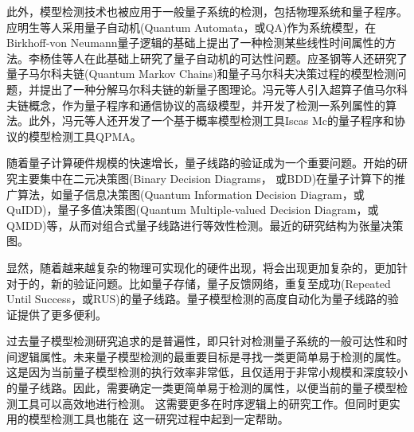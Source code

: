 此外，模型检测技术也被应用于一般量子系统的检测，包括物理系统和量子程序。应明生等人采用量子自动机(Quantum Automata，或QA)作为系统模型\citep{kondacs1997power}，在Birkhoff-von Neumann量子逻辑\citep{birkhoff1987logic}的基础上提出了一种检测某些线性时间属性的方法\citep{ying2014model}。李杨佳等人在此基础上研究了量子自动机的可达性问题\citep{li2014decidable}。应圣钢等人还研究了量子马尔科夫链(Quantum Markov Chains)\citep{ying2013verification}和量子马尔科夫决策过程的模型检测问题，并提出了一种分解马尔科夫链的新量子图理论\citep{ying2013reachability,ying2018reachability}。冯元等人引入超算子值马尔科夫链概念，作为量子程序和通信协议的高级模型，并开发了检测一系列属性的算法\citep{feng2013model,feng2013reachability,feng2017model}。此外，冯元等人还开发了一个基于概率模型检测工具Iscas Mc\citep{hahn2014iscas}的量子程序和协议的模型检测工具QPMA\citep{feng2015qpmc}。

随着量子计算硬件规模的快速增长，量子线路的验证成为一个重要问题。开始的研究主要集中在二元决策图(Binary Decision Diagrams， 或BDD)在量子计算下的推广算法，如量子信息决策图(Quantum Information Decision Diagram，或QuIDD)\citep{Viamontes_2003}，量子多值决策图(Quantum Multiple-valued Decision Diagram，或QMDD)\citep{Seiter_2013}等，从而对组合式量子线路进行等效性检测。最近的研究结构为张量决策图\citep{Hong_2022}。

显然，随着越来越复杂的物理可实现化的硬件出现，将会出现更加复杂的，更加针对于的，新的验证问题。比如量子存储\citep{Kerckhoff_2010}，量子反馈网络\citep{Gough_2008}，重复至成功(Repeated Until Success，或RUS)的量子线路\citep{Bocharov_2015}。量子模型检测的高度自动化为量子线路的验证提供了更多便利。

过去量子模型检测研究追求的是普遍性，即只针对检测量子系统的一般可达性和时间逻辑属性。未来量子模型检测的最重要目标是寻找一类更简单易于检测的属性。这是因为当前量子模型检测的执行效率非常低，且仅适用于非常小规模和深度较小的量子线路。因此，需要确定一类更简单易于检测的属性，以便当前的量子模型检测工具可以高效地进行检测\citep{ying2021model}。
这需要更多在时序逻辑上的研究工作。但同时更实用的模型检测工具也能在
这一研究过程中起到一定帮助。




